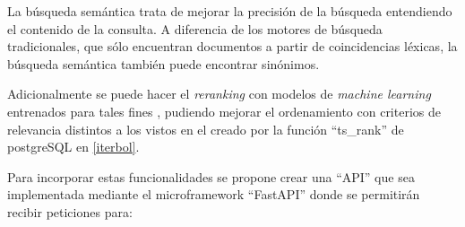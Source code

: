 \documentclass[
  12pt,
  openany]{book}
\begin{document}
La búsqueda semántica trata de mejorar la precisión de la búsqueda entendiendo el contenido de la consulta. A diferencia de los motores de búsqueda tradicionales, que sólo encuentran documentos a partir de coincidencias léxicas, la búsqueda semántica también puede encontrar sinónimos.

Adicionalmente se puede hacer el \emph{reranking} con modelos de \emph{machine learning} entrenados para tales fines \citep{gökçe2020}, \citep{nogueira2019} pudiendo mejorar el ordenamiento con criterios de relevancia distintos a los vistos en el creado por la función ``ts\_rank'' de postgreSQL en \ref{iterbol}.

Para incorporar estas funcionalidades se propone crear una ``API'' que sea implementada mediante el microframework ``FastAPI'' donde se permitirán recibir peticiones para:
\end{document}
